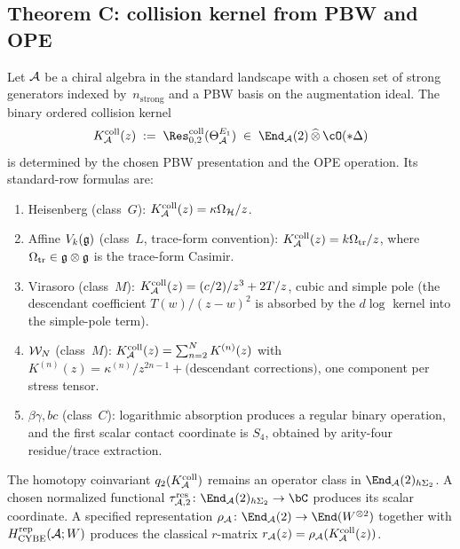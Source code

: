 \subsection{Theorem C: collision kernel from PBW and OPE}
\label{sec:part-iii-theorem-C}

\begin{theorem}
\label{thm:part-iii-rmatrix-emergent-from-pbw}
Let $\mathcal{A}$ be a chiral algebra in the standard landscape with a chosen
set of strong generators indexed by~$n_{\mathrm{strong}}$ and a PBW
basis on the augmentation ideal. The binary ordered collision kernel
\begin{equation}
 K_\cA^{\mathrm{coll}}(z)
 \;:=\; \Res^{\mathrm{coll}}_{0,2}(\Theta_\cA^{E_1})
 \;\in\; \End_\cA(2)\,\widehat\otimes\,\cO(*\Delta)
\end{equation}
is determined by the chosen PBW presentation and the OPE operation.
Its standard-row formulas are:
\begin{enumerate}[label=\textup{(\roman*)}, leftmargin=*]
 \item Heisenberg (class~$G$):
 $K_{\mathcal{A}}^{\mathrm{coll}}(z)=\kappa\Omega_{\mathcal H}/z$.
 \item Affine $V_k(\mathfrak{g})$ (class~$L$, trace-form convention):
 $K_{\mathcal{A}}^{\mathrm{coll}}(z)=k\Omega_{\mathrm{tr}}/z$, where
 $\Omega_{\mathrm{tr}}\in\mathfrak{g}\otimes\mathfrak{g}$ is the trace-form Casimir.
 \item Virasoro (class~$M$):
 $K_{\mathcal{A}}^{\mathrm{coll}}(z)=(c/2)/z^3+2T/z$, cubic and
 simple pole (the descendant coefficient $T(w)/(z-w)^2$ is absorbed
 by the $d\log$ kernel into the simple-pole term).
 \item $\mathcal{W}_N$ (class~$M$):
 $K_{\mathcal{A}}^{\mathrm{coll}}(z)=\sum_{n=2}^{N}K^{(n)}(z)$
 with $K^{(n)}(z)=\kappa^{(n)}/z^{2n-1}+\text{(descendant
 corrections)}$, one component per stress tensor.
 \item $\beta\gamma,bc$ (class~$C$): logarithmic absorption produces
 a regular binary operation, and the first scalar contact coordinate
 is $S_4$, obtained by arity-four residue/trace extraction.
\end{enumerate}
The homotopy coinvariant $q_2(K_{\mathcal{A}}^{\mathrm{coll}})$ remains an
operator class in $\End_\cA(2)_{h\Sigma_2}$. A chosen normalized
functional
$\tau_{\cA,2}^{\mathrm{res}}\colon
\End_\cA(2)_{h\Sigma_2}\to\bC$
produces its scalar coordinate. A specified representation
$\rho_\cA\colon\End_\cA(2)\to\End(W^{\otimes2})$ together with
$H_{\mathrm{CYBE}}^{\mathrm{rep}}(\mathcal{A};W)$ produces the classical
$r$-matrix $r_{\mathcal{A}}(z)=\rho_{\mathcal{A}}(K_{\mathcal{A}}^{\mathrm{coll}}(z))$.
\end{theorem}

